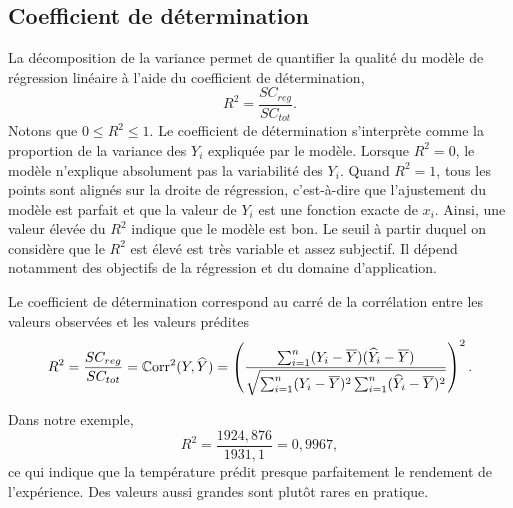 \subsection{Coefficient de détermination}
\label{sec:R2}


La décomposition de la variance permet de quantifier la qualité du modèle de régression linéaire à l'aide du coefficient de détermination,
\begin{equation}
R^2 =\frac{SC_{reg}} {SC_{tot}}.
\end{equation}
Notons que $0 \leq R^2 \leq 1$. Le coefficient de détermination s'interprète comme la proportion de la variance des $Y_i$ expliquée par le modèle. Lorsque $R^2=0$, le mod\`ele n'explique absolument pas la variabilité des $Y_i$. Quand $R^2=1$, tous les points sont alignés sur la droite de r\'egression, c'est-à-dire que l'ajustement du mod\`ele est parfait et que la valeur de $Y_i$ est une fonction exacte de $x_i$. Ainsi, une valeur élevée du $R^2$ indique que le modèle est bon.  Le seuil à partir duquel on considère que le $R^2$ est élevé est très variable et assez subjectif. Il dépend notamment des objectifs de la régression et du domaine d'application.

Le coefficient de détermination correspond au carré de la corrélation entre les valeurs observées et les valeurs prédites
 \[R^2 = \frac{SC_{reg}} {SC_{tot}} = \mathbb{C}\text{orr}^2 (Y, \widehat{Y})=\left(\frac{\sum_{i=1}^n (Y_i - \overline{Y})(\widehat{Y}_i - \overline{Y})}{\sqrt{\sum_{i=1}^n (Y_i - \overline{Y})^2\sum_{i=1}^n(\widehat{Y}_i - \overline{Y})^2}}\right)^2.
\]


\begin{exemple}
Dans notre exemple,
$$R^2 = \frac{1924,876}{1931,1} = 0,9967,$$
ce qui indique que la température prédit presque parfaitement le rendement de l'expérience. Des valeurs aussi grandes sont plutôt rares en pratique.
\end{exemple}
